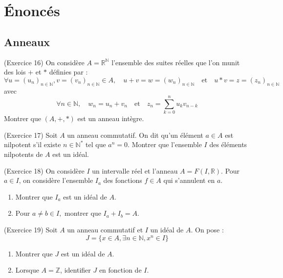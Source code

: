 \section{Énoncés}
\setcounter{numexo}{15}

\subsection{Anneaux}

\begin{exercice}
(Exercice 16)
On considère $A=\mathbb{R}^{\mathbb{N}}$ l'ensemble des suites réelles que l'on munit des lois $+$ et $*$ définies par : 
$$ \forall u=(u_{n})_{n\in\mathbb{N}}, v=(v_{n})_{n\in\mathbb{N}}\in A, \quad u+v=w=(w_{n})_{n\in\mathbb{N}} \quad \text{et} \quad u*v=z=(z_{n})_{n\in\mathbb{N}} $$ 
avec 
$$ \forall n\in\mathbb{N}, \quad w_{n}=u_{n}+v_{n} \quad \text{et} \quad z_{n}=\sum_{k=0}^{n}u_{k}v_{n-k} $$ 
Montrer que $(A,+,*)$ est un anneau intègre. 
\end{exercice}

\begin{exercice}
(Exercice 17)
Soit $A$ un anneau commutatif. On dit qu'un élément $a\in A$ est nilpotent s'il existe $n\in\mathbb{N}^{*}$ tel que $a^{n}=0$. 
Montrer que l'ensemble $I$ des éléments nilpotents de $A$ est un idéal. 
\end{exercice}

\begin{exercice}
(Exercice 18)
On considère $I$ un intervalle réel et l'anneau $A=F(I,\mathbb{R})$. 
Pour $a\in I$, on considère l'ensemble $I_{a}$ des fonctions $f\in A$ qui s'annulent en $a$. 
\begin{enumerate}
 \item[a)] Montrer que $I_{a}$ est un idéal de $A$. 
 \item[b)] Pour $a\ne b\in I,$ montrer que $I_{a}+I_{b}=A$. 
\end{enumerate}
\end{exercice}

\begin{exercice}
(Exercice 19)
Soit $A$ un anneau commutatif et $I$ un idéal de $A$. 
On pose :
$$ J=\{x\in A,\exists n\in\mathbb{N},x^{n}\in I\} $$ 
\begin{enumerate}
 \item Montrer que $J$ est un idéal de $A$. 
 \item Lorsque $A=\mathbb{Z}$, identifier $J$ en fonction de $I$. 
\end{enumerate}
\end{exercice}

